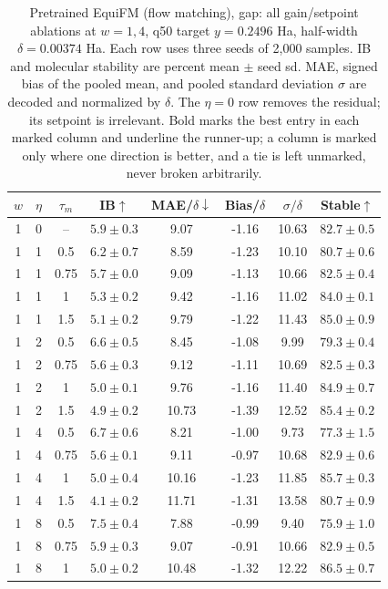 \documentclass{article}
\begin{document}
\begin{table}[!htbp]
\centering\small
\caption{Pretrained EquiFM (flow matching), gap: all gain/setpoint ablations at $w=1,4$, q50 target $y=0.2496$ Ha, half-width $\delta=0.00374$ Ha. Each row uses three seeds of 2,000 samples. IB and molecular stability are percent mean $\pm$ seed sd. MAE, signed bias of the pooled mean, and pooled standard deviation $\sigma$ are decoded and normalized by $\delta$. The $\eta=0$ row removes the residual; its setpoint is irrelevant. Bold marks the best entry in each marked column and underline the runner-up; a column is marked only where one direction is better, and a tie is left unmarked, never broken arbitrarily.}
\label{tab:grid-equifm-gap}
\begin{tabular}{cccccccc}
\toprule
$w$ & $\eta$ & $\tau_m$ & IB$\uparrow$ & MAE/$\delta\downarrow$ & Bias/$\delta$ & $\sigma/\delta$ & Stable$\uparrow$\\
\midrule
1 & 0 & -- & $5.9\pm0.3$ & 9.07 & -1.16 & 10.63 & $82.7\pm0.5$\\
1 & 1 & 0.5 & $6.2\pm0.7$ & 8.59 & -1.23 & 10.10 & $80.7\pm0.6$\\
1 & 1 & 0.75 & $5.7\pm0.0$ & 9.09 & -1.13 & 10.66 & $82.5\pm0.4$\\
1 & 1 & 1 & $5.3\pm0.2$ & 9.42 & -1.16 & 11.02 & $84.0\pm0.1$\\
1 & 1 & 1.5 & $5.1\pm0.2$ & 9.79 & -1.22 & 11.43 & $85.0\pm0.9$\\
1 & 2 & 0.5 & $6.6\pm0.5$ & 8.45 & -1.08 & 9.99 & $79.3\pm0.4$\\
1 & 2 & 0.75 & $5.6\pm0.3$ & 9.12 & -1.11 & 10.69 & $82.5\pm0.3$\\
1 & 2 & 1 & $5.0\pm0.1$ & 9.76 & -1.16 & 11.40 & $84.9\pm0.7$\\
1 & 2 & 1.5 & $4.9\pm0.2$ & 10.73 & -1.39 & 12.52 & $85.4\pm0.2$\\
1 & 4 & 0.5 & $6.7\pm0.6$ & 8.21 & -1.00 & 9.73 & $77.3\pm1.5$\\
1 & 4 & 0.75 & $5.6\pm0.1$ & 9.11 & -0.97 & 10.68 & $82.9\pm0.6$\\
1 & 4 & 1 & $5.0\pm0.4$ & 10.16 & -1.23 & 11.85 & $85.7\pm0.3$\\
1 & 4 & 1.5 & $4.1\pm0.2$ & 11.71 & -1.31 & 13.58 & $80.7\pm0.9$\\
1 & 8 & 0.5 & $7.5\pm0.4$ & 7.88 & -0.99 & 9.40 & $75.9\pm1.0$\\
1 & 8 & 0.75 & $5.9\pm0.3$ & 9.07 & -0.91 & 10.66 & $82.9\pm0.5$\\
1 & 8 & 1 & $5.0\pm0.2$ & 10.48 & -1.32 & 12.22 & $\mathbf{86.5\pm0.7}$\\

\end{tabular}
\end{table}
\end{document}
